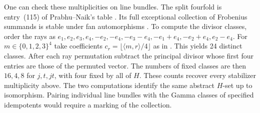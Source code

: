 One can check these multiplicities on line bundles. The split fourfold is entry~(115) of Prabhu--Naik's table \cite[Appendix~A]{PN}. Its full exceptional collection of Frobenius summands is stable under fan automorphisms \cite[\S4C, p.~233]{BDM}. To compute the divisor classes, order the rays as $e_1,e_2,e_3,e_4,-e_2,-e_4,-e_3-e_4,-e_1+e_4,-e_2+e_4,e_2-e_4$. For $m\in\{0,1,2,3\}^4$ take coefficients $c_r=\lfloor\langle m,r\rangle/4\rfloor$ as in \cite[\S4.1]{PN}. This yields 24 distinct classes. After each ray permutation subtract the principal divisor whose first four entries are those of the permuted vector. The numbers of fixed classes are then $16,4,8$ for $j,t,jt$, with four fixed by all of $H$. These counts recover every stabilizer multiplicity above. The two computations identify the same abstract $H$-set up to isomorphism. Pairing individual line bundles with the Gamma classes of specified idempotents would require a marking of the collection.
